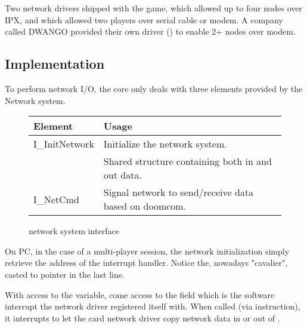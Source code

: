 Two network drivers shipped with the game,  which allowed up to four nodes over IPX, and  which allowed two players over serial cable or modem. A company called DWANGO provided their own driver () to enable 2+ nodes over modem.





\vspace{-5pt}
\subsection{Implementation}
To perform network I/O, the core only deals with three elements provided by the Network system.\\
\par
 \begin{figure}[H]
\centering  
\begin{tabularx}{\textwidth}{ L{0.6}  L{1.4}}
  \toprule
  \textbf{Element} &  \textbf{Usage}\\

  \toprule 
   I\_InitNetwork & Initialize the network system.\\
    & Shared structure containing both in and out data.\\
   I\_NetCmd & Signal network to send/receive data based on doomcom.\\
   \toprule
\end{tabularx}
\caption{\doom{} network system interface}
\end{figure}


\vspace{-10pt}
On PC, in the case of a multi-player session, the network initialization simply retrieve the address of the interrupt handler. Notice the, nowadays "cavalier",  casted to pointer in the last line.\\
\par











With access to the  variable, come access to the field  which is the software interrupt the \doom{} network driver registered itself with. When called (via  instruction), it interrupts \doom{} to let the card network driver copy network data in or out of .\\



